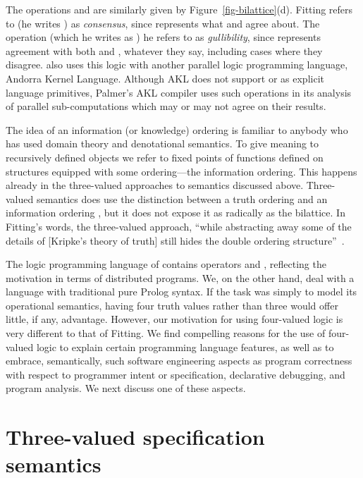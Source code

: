 \documentclass{tlp}
\begin{document}
\noindent
The operations  and  are similarly given by 
Figure~\ref{fig-bilattice}(d).
Fitting refers to  (he writes ) as \emph{consensus},
since  represents what  and  agree about.
The  operation (which he writes as ) he refers to as
\emph{gullibility}, since  represents agreement with both
 and , whatever they say, including cases where they disagree.
 also uses this logic with another parallel logic
programming language, Andorra Kernel Language.  Although AKL does not
support  or  as explicit language primitives, Palmer's
AKL compiler uses such operations in its analysis of parallel
sub-computations which may or may not agree on their results.


The idea of an information (or knowledge) ordering is familiar to anybody
who has used domain theory and denotational semantics.
To give meaning to recursively defined objects we refer to fixed points
of functions defined on structures equipped with some ordering---the
information ordering.
This happens already in the three-valued approaches to semantics
discussed above. 
Three-valued semantics does use the
distinction between a truth ordering  and an information ordering
, but it does not expose it as radically as the bilattice.
In Fitting's words, the three-valued approach, ``while abstracting away
some of the details of [Kripke's theory of truth] still hides the
double ordering structure''~\cite{fitting:2006}.

The logic programming language of  contains
operators  and , reflecting the motivation in terms of
distributed programs.
We, on the other hand, deal with a language with traditional pure 
Prolog syntax. 
If the task was simply to model its operational semantics,
having four truth values rather than three would offer little, if any,
advantage.
However, our motivation for using four-valued logic is very different
to that of Fitting.
We find compelling reasons for the use of four-valued logic 
to explain certain programming language features, as well as to
embrace, semantically, such software engineering aspects as
program correctness with respect to programmer intent or specification,
declarative debugging, and program analysis.
We next discuss one of these aspects.

\section{Three-valued specification semantics}
\label{sec-intentional}
\end{document}
